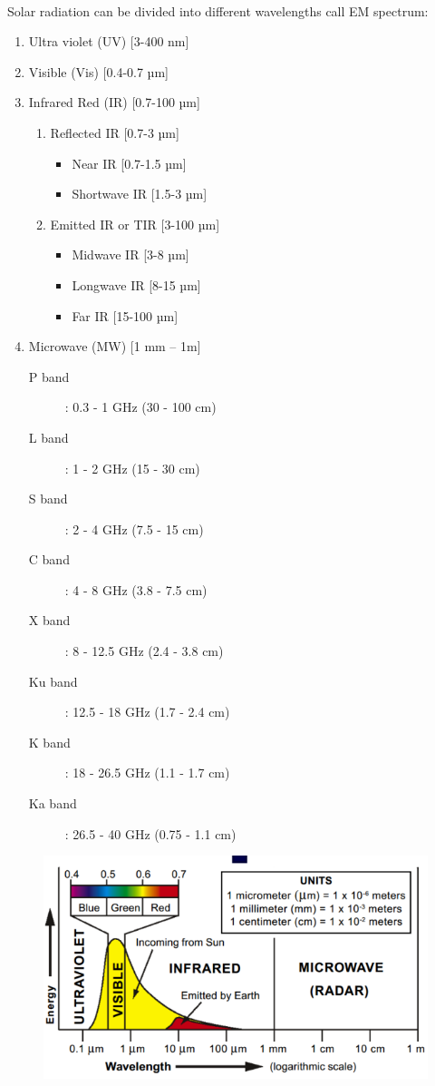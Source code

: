 \begin{description}
\paragraph{}
Solar radiation can be divided into different wavelengths call EM spectrum:
\begin{enumerate}
\item Ultra violet (UV) [3-400 nm] 
\item Visible (Vis) [0.4-0.7 µm]
\item Infrared Red (IR) [0.7-100 µm]
\begin{enumerate}
\item Reflected IR [0.7-3 µm]
\begin{itemize} 
\item Near IR [0.7-1.5 µm]
\item Shortwave IR [1.5-3 µm]
\end{itemize}
\item Emitted IR or TIR [3-100 µm] 
\begin{itemize} 
\item Midwave IR [3-8 µm]
\item Longwave IR [8-15 µm]
\item Far IR [15-100 µm]
\end{itemize}
\end{enumerate} 
\item Microwave (MW) [1 mm – 1m]
\begin{description}
\item[P band]: 0.3 - 1 GHz (30 - 100 cm)
\item[L band]: 1 - 2 GHz (15 - 30 cm)
\item[S band]: 2 - 4 GHz (7.5 - 15 cm)
\item[C band]: 4 - 8 GHz (3.8 - 7.5 cm)
\item[X band]: 8 - 12.5 GHz (2.4 - 3.8 cm)
\item[Ku band]: 12.5 - 18 GHz (1.7 - 2.4 cm)
\item[K band]: 18 - 26.5 GHz (1.1 - 1.7 cm)
\item[Ka band]: 26.5 - 40 GHz (0.75 - 1.1 cm)
\end{description}
\end{enumerate}
\begin{figure}[H]
\begin{center}
\includegraphics[scale=0.8]{image1.png} %

\end{center}
\end{figure}
\end{description}
